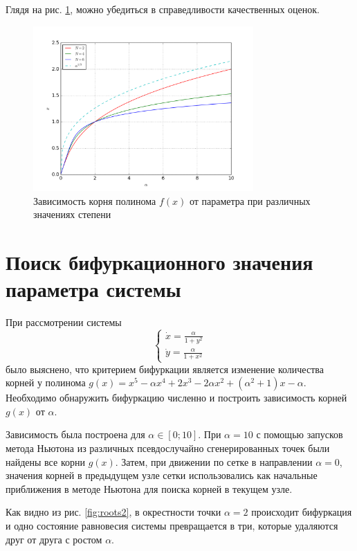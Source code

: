 \documentclass[a4paper]{article}
\begin{document}
Глядя на рис. \ref{fig:roots}, можно убедиться в справедливости качественных оценок.

\begin{figure}[ht]
	\center
  \includegraphics[width=0.75\textwidth]{../pictures/lab1_roots.png}
  \caption{Зависимость корня полинома \(f(x)\) от параметра при различных значениях степени}
  \label{fig:roots}
\end{figure}

\section{Поиск бифуркационного значения параметра системы}
При рассмотрении системы
\begin{displaymath}
	\left\{
  \begin{array}{lr}
    \dot x = \frac{\alpha}{1+y^2}\\
		\dot y = \frac{\alpha}{1+x^2}
  \end{array}
\right.
\end{displaymath}
было выяснено, что критерием бифуркации является изменение количества корней у
полинома \(g(x)=x^5-\alpha x^4 +2x^3 - 2\alpha x^2 + (\alpha^2+1)x-\alpha\).
Необходимо обнаружить бифуркацию численно и построить зависимость корней \(g(x)\)
от \(\alpha\).

Зависимость была построена для \(\alpha \in [0;10]\). При \(\alpha=10\) с помощью
запусков метода Ньютона из различных псевдослучайно сгенерированных точек были найдены
все корни \(g(x)\). Затем, при движении по сетке в направлении \(\alpha=0\),
значения корней в предыдущем узле сетки использовались как начальные приближения
в методе Ньютона для поиска корней в текущем узле.

Как видно из рис. \ref{fig:roots2}, в окрестности точки \(\alpha=2\) происходит
бифуркация и одно состояние равновесия системы превращается в три, которые удаляются
друг от друга с ростом \(\alpha\).
\end{document}
